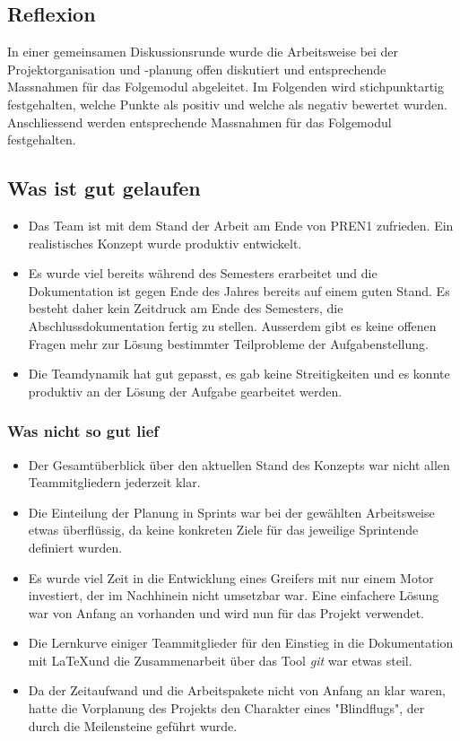 \documentclass[main.tex]{subfiles} %
\begin{document}
\subsection{Reflexion}
In einer gemeinsamen Diskussionsrunde wurde die Arbeitsweise bei der
Projektorganisation und -planung offen diskutiert und entsprechende Massnahmen
für das Folgemodul abgeleitet. Im Folgenden wird stichpunktartig festgehalten,
welche Punkte als positiv und welche als negativ bewertet wurden. Anschliessend
werden entsprechende Massnahmen für das Folgemodul festgehalten.

\subsection*{Was ist gut gelaufen}

\begin{itemize}
    \item Das Team ist mit dem Stand der Arbeit am Ende von PREN1 zufrieden. Ein
          realistisches Konzept wurde produktiv entwickelt.
    \item Es wurde viel bereits während des Semesters erarbeitet und die Dokumentation
          ist gegen Ende des Jahres bereits auf einem guten Stand. Es besteht daher kein
          Zeitdruck am Ende des Semesters, die Abschlussdokumentation fertig zu stellen.
          Ausserdem gibt es keine offenen Fragen mehr zur Lösung bestimmter Teilprobleme
          der Aufgabenstellung.
    \item Die Teamdynamik hat gut gepasst, es gab keine Streitigkeiten und es konnte
          produktiv an der Lösung der Aufgabe gearbeitet werden.
\end{itemize}

\subsubsection*{Was nicht so gut lief}

\begin{itemize}
    \item Der Gesamtüberblick über den aktuellen Stand des Konzepts war nicht allen
          Teammitgliedern jederzeit klar.
    \item Die Einteilung der Planung in Sprints war bei der gewählten Arbeitsweise etwas
          überflüssig, da keine konkreten Ziele für das jeweilige Sprintende definiert
          wurden.
    \item Es wurde viel Zeit in die Entwicklung eines Greifers mit nur einem Motor
          investiert, der im Nachhinein nicht umsetzbar war. Eine einfachere Lösung war
          von Anfang an vorhanden und wird nun für das Projekt verwendet.
    \item Die Lernkurve einiger Teammitglieder für den Einstieg in die Dokumentation mit
          \LaTeX und die Zusammenarbeit über das Tool \textit{git} war etwas steil.
    \item Da der Zeitaufwand und die Arbeitspakete nicht von Anfang an klar waren, hatte
          die Vorplanung des Projekts den Charakter eines "Blindflugs", der durch die
          Meilensteine geführt wurde.

\end{itemize}
\end{document}
